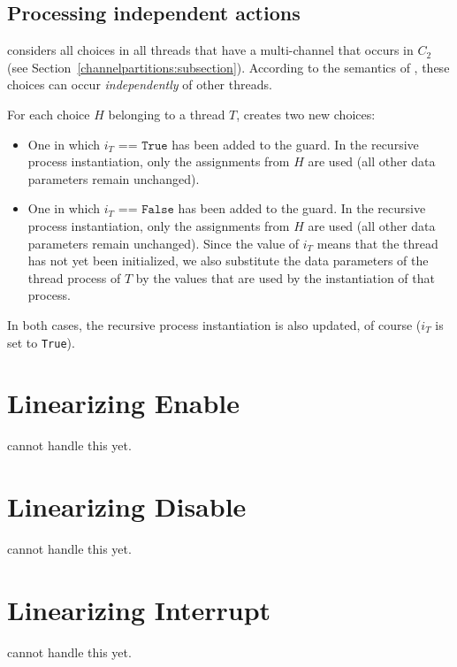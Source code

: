 \begin{samepage}
\subsection{Processing independent actions}

\lpeq{} considers all choices in all threads that have a multi-channel that occurs in $C_2$ (see Section~\ref{channelpartitions:subsection}).
According to the semantics of \txs{}, these choices can occur \emph{independently} of other threads.

For each choice $H$ belonging to a thread $T$, \lpeq{} creates two new choices:
\begin{itemize}
\item One in which $i_T \texttt{ == True}$ has been added to the guard.
In the recursive process instantiation, only the assignments from $H$ are used (all other data parameters remain unchanged).
\item One in which $i_T \texttt{ == False}$ has been added to the guard.
In the recursive process instantiation, only the assignments from $H$ are used (all other data parameters remain unchanged).
Since the value of $i_T$ means that the thread has not yet been initialized, we also substitute the data parameters of the thread process of $T$ by the values that are used by the instantiation of that process.
\end{itemize}
In both cases, the recursive process instantiation is also updated, of course ($i_T$ is set to \texttt{True}).
\end{samepage}

\section{Linearizing Enable}

\lpeq{} cannot handle this yet.

\section{Linearizing Disable}

\lpeq{} cannot handle this yet.

\section{Linearizing Interrupt}

\lpeq{} cannot handle this yet.

